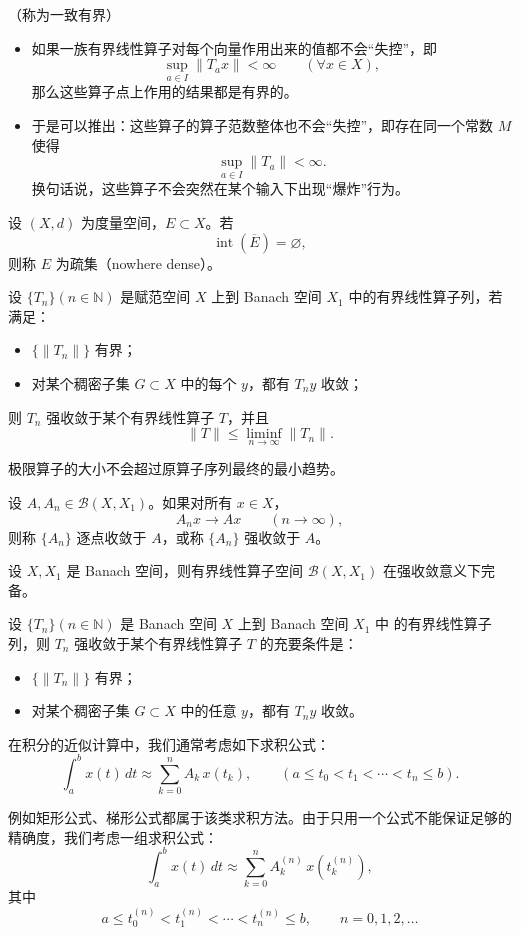 （称为一致有界）
\begin{itemize}
  \item 如果一族有界线性算子对每个向量作用出来的值都不会“失控”，即
    \[
    \sup_{a \in I} \|T_a x\| < \infty \qquad (\forall x \in X),
    \]
    那么这些算子点上作用的结果都是有界的。

  \item 于是可以推出：这些算子的算子范数整体也不会“失控”，即存在同一个常数 $M$ 使得
    \[
    \sup_{a \in I} \|T_a\| < \infty.
    \]
    换句话说，这些算子不会突然在某个输入下出现“爆炸”行为。
\end{itemize}
\begin{definition}[疏集]
设 $(X,d)$ 为度量空间，$E \subset X$。若
\[
\operatorname{int}(\overline{E}) = \varnothing,
\]
则称 $E$ 为疏集（nowhere dense）。
\end{definition}
\begin{theorem}
设 $\{T_n\}(n \in \mathbb{N})$ 是赋范空间 $X$ 上到 Banach 空间 $X_1$ 中的有界线性算子列，若满足：
\begin{itemize}
    \item $\{\|T_n\|\}$ 有界；
    \item 对某个稠密子集 $G \subset X$ 中的每个 $y$，都有 $T_n y$ 收敛；
\end{itemize}
则 $T_n$ 强收敛于某个有界线性算子 $T$，并且
\[
\|T\| \le \liminf_{n \to \infty} \|T_n\|.
\]
\end{theorem}
极限算子的大小不会超过原算子序列最终的最小趋势。
\begin{definition}
设 $A, A_n \in \mathcal{B}(X, X_1)$。如果对所有 $x \in X$，
\[
A_n x \to A x \qquad (n \to \infty),
\]
则称 $\{A_n\}$ 逐点收敛于 $A$，或称 $\{A_n\}$ 强收敛于 $A$。
\end{definition}
\begin{theorem}[强收敛完备]
设 $X, X_1$ 是 Banach 空间，则有界线性算子空间 $\mathcal{B}(X, X_1)$
在强收敛意义下完备。
\end{theorem}

\begin{theorem}[强收敛条件]
设 $\{T_n\}(n \in \mathbb{N})$ 是 Banach 空间 $X$ 上到 Banach 空间 $X_1$ 中
的有界线性算子列，则 $T_n$ 强收敛于某个有界线性算子 $T$ 的充要条件是：
\begin{itemize}
    \item $\{\|T_n\|\}$ 有界；
    \item 对某个稠密子集 $G \subset X$ 中的任意 $y$，都有 $T_n y$ 收敛。
\end{itemize}
\end{theorem}
\begin{example}[机械求积公式的收敛性]
在积分的近似计算中，我们通常考虑如下求积公式：
\[
\int_a^b x(t)\, dt \approx \sum_{k=0}^{n} A_k \, x(t_k), 
\qquad (a \le t_0 < t_1 < \cdots < t_n \le b).
\]

例如矩形公式、梯形公式都属于该类求积方法。由于只用一个公式不能保证足够的精确度，我们考虑一组求积公式：
\[
\int_a^b x(t)\, dt \approx \sum_{k=0}^{n} A_k^{(n)} \, x\!\left(t_k^{(n)}\right),
\tag{3.2.1}
\]
其中
\[
a \le t_0^{(n)} < t_1^{(n)} < \cdots < t_n^{(n)} \le b, 
\qquad n = 0,1,2,\ldots
\]
\end{example}


